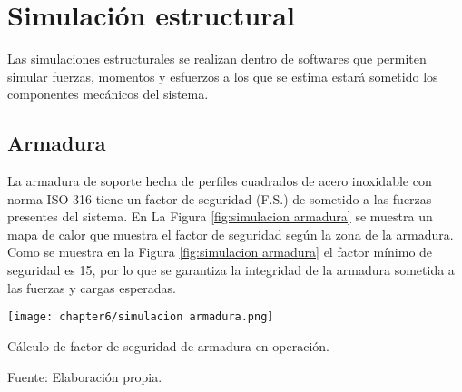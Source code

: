 

\section{Simulación estructural}

Las simulaciones estructurales se realizan dentro de softwares que permiten simular fuerzas, momentos y esfuerzos a los que se estima estará sometido los componentes mecánicos del sistema.

\subsection{Armadura}

La armadura de soporte hecha de perfiles cuadrados de acero inoxidable con norma ISO 316 tiene un factor de seguridad (F.S.) de sometido a las fuerzas presentes del sistema. En La Figura \ref{fig:simulacion armadura} se muestra un mapa de calor que muestra el factor de seguridad según la zona de la armadura. Como se muestra en la Figura  \ref{fig:simulacion armadura} el factor mínimo de seguridad es 15, por lo que se garantiza la integridad de la armadura sometida a las fuerzas y cargas esperadas.

\begin{myfigure}[H]
	\footnotesize\centering
	\texttt{[image: chapter6/simulacion armadura.png]}
	\caption{Cálculo de factor de seguridad de armadura en operación.}
	\begin{myflushcenter}
		Fuente: Elaboración propia.
	\end{myflushcenter}
	\label{fig:simulacion armadura}
\end{myfigure}


